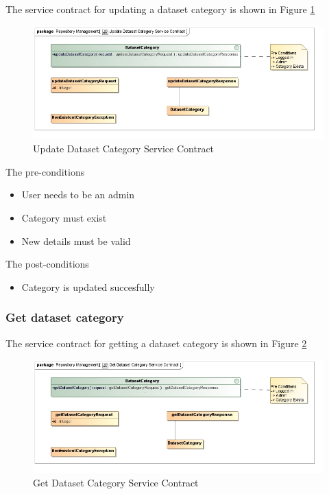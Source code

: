 The service contract for updating a dataset category is shown in Figure \ref{fig:updateDatasetCatService}
\begin{figure}[H]
  \begin{center}
  \includegraphics[scale=0.6]{../Diagrams and Charts/Test Data/Update Dataset Category Service Contract.jpg}
  \caption{Update Dataset Category Service Contract}
  \label{fig:updateDatasetCatService}
  \end{center}
  
\end{figure}


The pre-conditions
\begin{itemize}
  \item User needs to be an admin
  \item Category must exist
  \item New details must be valid
\end{itemize}

The post-conditions
\begin{itemize}
  \item Category is updated succesfully
\end{itemize}
\subsubsection {Get dataset category}

The service contract for getting a dataset category is shown in Figure \ref{fig:getDatasetCatService}
\begin{figure}[H]
  \begin{center}
  \includegraphics[scale=0.6]{../Diagrams and Charts/Test Data/Get Dataset Category Service Contract.jpg}
  \caption{Get Dataset Category Service Contract}
  \label{fig:getDatasetCatService}
  \end{center}
  
\end{figure}

